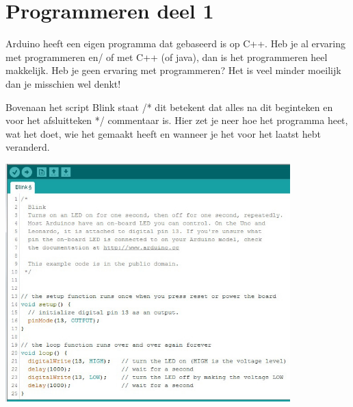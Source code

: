 \documentclass{arduino}
\begin{document}
\newlength{\biggraphicwithtext}
\setlength{\biggraphicwithtext}{\dimexpr(\textwidth+65mm)\relax}
\setlength{\textwidthnexttobiggraphic}{\dimexpr(\biggraphicwithtext-120mm)\relax}
\begin{minipage}{\biggraphicwithtext}
\begin{minipage}{\textwidthnexttobiggraphic}
\section{Programmeren deel 1}\vspace{\baselineskip}

Arduino heeft een eigen programma dat gebaseerd is op C++. Heb je al ervaring met programmeren en/ of met C++ (of java), dan is het programmeren heel makkelijk. Heb je geen ervaring met programmeren? Het is veel minder moeilijk dan je misschien wel denkt!\vspace{\baselineskip}

Bovenaan het script Blink staat /* dit betekent dat alles na dit beginteken en voor het afsluitteken */ commentaar is. Hier zet je neer hoe het programma heet, wat het doet, wie het gemaakt heeft en wanneer je het voor het laatst hebt veranderd.
\end{minipage}\hfill\begin{minipage}{12cm}
\raggedleft
\includegraphics[width=11cm]{12. Arduino code}
\end{minipage}
\end{minipage}

\smallskip
\end{document}
